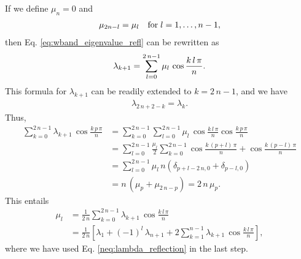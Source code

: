 \documentclass[reprint, floatfix]{revtex4-1}
\begin{document}
{  %
  If we define $\mu_n = 0$ and
  \begin{align}
    \mu_{ 2 n - l } = \mu_l
    \quad
    \mathrm{for\;} l = 1, \dots, n - 1,
  \notag
  \end{align}
  then Eq. \eqref{eq:wband_eigenvalue_refl} can be rewritten as
  \begin{align}
    \lambda_{k+1}
    =
    \sum_{ l = 0 }^{ 2 \, n - 1 }
    \mu_l \, \cos \frac{ k \, l \, \pi } { n }.
  \notag
  \end{align}
  This formula for $\lambda_{k+1}$
  can be readily extended to $k = 2 \, n - 1$,
  and we have
  \begin{align}
    \lambda_{ 2 \, n + 2 - k } = \lambda_k.
    \tag{N3}
    \label{neq:lambda_reflection}
  \end{align}
  Thus,
  $$
  \begin{aligned}
    \sum_{ k = 0 }^{ 2 \, n - 1 }
      \lambda_{ k + 1 } \,
      \cos \frac{ k \, p \, \pi }
                {      n        }
    &=
    \sum_{ k = 0 }^{ 2 \, n - 1 }
      \sum_{ l = 0 }^{ 2 \, n - 1 }
        \mu_l \,
        \cos \frac{ k \, l \, \pi }
                  {      n        }
        \cos \frac{ k \, p \, \pi }
                  {      n        }
    \\
    &=
    \sum_{ l = 0 }^{ 2 \, n - 1 }
      \frac{ \mu_l } { 2 }
      \sum_{ k = 0 }^{ 2 \, n - 1 }
        \cos \frac{ k \, (p + l) \, \pi }
                  {      n        }
                  +
        \cos \frac{ k \, (p - l) \, \pi }
                  {      n        }
    \\
    &=
    \sum_{ l = 0 }^{ 2 \, n - 1 }
      \mu_l \, n \left(
        \delta_{ p + l - 2 \, n, 0 }
        +
        \delta_{ p - l, 0 }
      \right)
    \\
    &=
    n \, \left( \mu_p + \mu_{ 2 \, n - p} \right)
    =
    2 \, n \, \mu_p.
  \end{aligned}
  $$
  This entails
  $$
  \begin{aligned}
    \mu_l
    &=
    \frac{    1   }
         { 2 \, n }
    \sum_{ k = 0 }^{ 2 \, n - 1 }
      \lambda_{ k + 1 } \,
      \cos \frac{ k \, l \, \pi }
                {      n        }
              \\
    &=
    \frac{    1   }
         { 2 \, n }
    \left[
      \lambda_1
      +
      (-1)^l \, \lambda_{n + 1}
      +
      2 \sum_{ k = 1 }^{ n - 1 }
        \lambda_{ k + 1 } \,
        \cos \frac{ k \, l \, \pi }
                  {      n        }
    \right],
  \end{aligned}
  $$
  where we have used Eq. \eqref{neq:lambda_reflection}
  in the last step.

}
\end{document}
